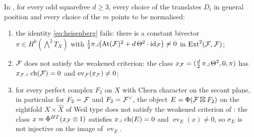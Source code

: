 \begin{theorem}
\label{thm:candidatefails}
In , for every odd squarefree $d\ge3$, every choice of the
translates $D_{i}$ in general position and every choice of the $m$ points to
be normalised:
\begin{enumerate}[label=\textup{(\roman*)},nosep]
\item the identity \eqref{eq:heisenberg} fails: there is a constant bivector
  $\pi\in H^{0}(\bigwedge^{2}T_{X})$ with
  $\tfrac12\pi\lrcorner\bigl(\mathrm{At}(\mathcal{F})^{2}+d\,\Theta^{2}\cdot\operatorname{id}_{\mathcal{F}}\bigr)\ne0$
  in $\operatorname{Ext}^{2}(\mathcal{F},\mathcal{F})$;
\item $\mathcal{F}$ does not satisfy the weakened criterion: the class
  $x_{\mathcal{F}}=(\tfrac d2\,\pi\lrcorner\,\Theta^{2},0,\pi)$ has
  $x_{\mathcal{F}}\lrcorner\,\operatorname{ch}(\mathcal{F})=0$ and $\operatorname{ev}_{\mathcal{F}}(x_{\mathcal{F}})\ne0$;
\item for every perfect complex $F_{2}$ on $X$ with Chern character on the
  secant plane, in particular for $F_{2}=\mathcal{F}$ and $F_{2}=\mathcal{F}^{\vee}$, the
  object $E=\Phi(\mathcal{F}\boxtimes F_{2})$ on the eightfold $X\times\widehat X$ of
  Weil type does not satisfy the weakened criterion of
  \cite[Question 11.4]{Mar25b}: the class $x=\Phi^{HT}(x_{\mathcal{F}}\otimes1)$
  satisfies $x\lrcorner\,\operatorname{ch}(E)=0$ and $\operatorname{ev}_{E}(x)\ne0$, so
  $\sigma_{E}$ is not injective on the image of $\operatorname{ev}_{E}$.
\end{enumerate}
\end{theorem}

